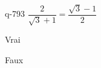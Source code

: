 \begin{truefalse}{q-793}
$\dfrac{2}{\sqrt{3}+1} = \dfrac{\sqrt{3}-1}{2}$
\item Vrai
\item* Faux
\end{truefalse}

